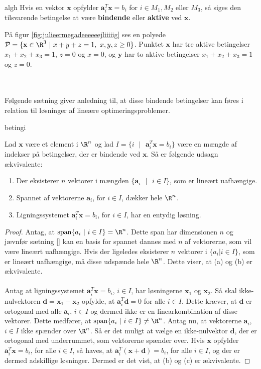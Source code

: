 %
\begin{defn}{}{algh}
Hvis en vektor $\textbf{x}$ opfylder $\textbf{a}^T_i\textbf{x}= b_i$ for $i \in M_1, M_2 \text{ eller } M_3$, så siges den tilsvarende betingelse at være \textbf{bindende} eller \textbf{aktive} ved $\textbf{x}$.
\end{defn}\noindent
%
På figur \ref{fig:julieermegadeeeeeejliiiiig} ses en polyede $\mathcal{P}= \{ \mathbf{x} \in \R^3 \text{  } | \text{  } x + y + z = 1, \text{  } x , y, z \geq 0  \}$. 
Punktet $\textbf{x}$ har tre aktive betingelser $x_1 + x_2 + x_3 = 1$, $z=0$ og $x=0$, og $\mathbf{y}$ har to aktive betingelser $x_1 + x_2 + x_3 = 1$ og $z=0$.
%
%

\\\\
%
%
%
Følgende sætning giver anledning til, at disse bindende betingelser kan føres i relation til løsninger af lineære optimeringsproblemer.
%
\begin{thm}{}{betingi}

Lad $\textbf{x}$ være et element i $\R^n$ og lad $I=\{i \text{ } | \text{ } \textbf{a}^T_i\textbf{x}=b_i\}$ være en mængde af indekser på betingelser, der er bindende ved $\textbf{x}$.
Så er følgende udsagn ækvivalente:
%
\begin{enumerate}[label=(\alph*)]
\item Der eksisterer $n$ vektorer i mængden $\{\textbf{a}_i \text{ } | \text{ } i \in I \}$, som er lineært uafhængige.
\item Spannet af vektorerne $\textbf{a}_i$, for $i \in I$, dækker hele $\R^n$.
\item Ligningssystemet $\textbf{a}^T_i\textbf{x}= b_i$, for $i \in I$, har en entydig løsning.
\end{enumerate}
\end{thm}
%
\begin{proof}
Antag, at $\text{span}\{a_i \text{ } | \text{ } i \in I\}= \R^n$.
Dette span har dimensionen $n$ og jævnfør sætning \ref{} %
kan en basis for spannet dannes med $n$ af vektorerne, som vil være lineært uafhængige.
%
Hvis der ligeledes eksisterer $n$ vektorer i $\{a_i|i \in I\}$, som er lineært uafhængige, må disse udspænde hele $\R^n$.
Dette viser, at (a) og (b) er ækvivalente.\\\\
%
Antag at ligningssystemet $\textbf{a}^T_i\textbf{x}=b_i$, $i \in I$, har løsningerne $\textbf{x}_1$ og $\textbf{x}_2$.
Så skal ikke-nulvektoren $\textbf{d} = \textbf{x}_1 - \textbf{x}_2$ opfylde, at $\textbf{a}^T_i\textbf{d}=0$ for alle $i \in I$.
Dette kræver, at $\textbf{d}$ er ortogonal med alle $\textbf{a}_i$, $i \in I$ og dermed ikke er en linearkombination af disse vektorer.
Dette medfører, at $\text{span}\{a_i \text{ } | \text{ } i \in I\} \neq \R^n$.
%
Antag nu, at vektorerne $\textbf{a}_i$, $i \in I$ ikke spænder over $\R^n$.
Så er det muligt at vælge en ikke-nulvektor $\textbf{d}$, der er ortogonal med underrummet, som vektorerne spænder over.
Hvis $\textbf{x}$ opfylder  $\textbf{a}^T_i\textbf{x}= b_i$, for alle $i \in I$, så haves, at $\textbf{a}^T_i(\textbf{x}+\textbf{d})= b_i$, for alle $i \in I$, og der er dermed adskillige løsninger.
Dermed er det vist, at (b) og (c) er ækvivalente.
\end{proof}\\
